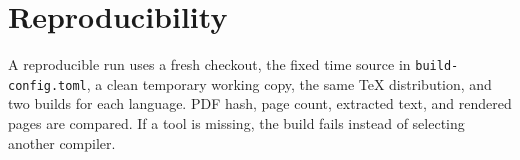\section{Reproducibility}
\label{app:reproducibility}

A reproducible run uses a fresh checkout, the fixed time source in
\texttt{build-config.toml}, a clean temporary working copy, the same TeX distribution,
and two builds for each language. PDF hash, page count, extracted text, and rendered pages
are compared. If a tool is missing, the build fails instead of selecting another compiler.
